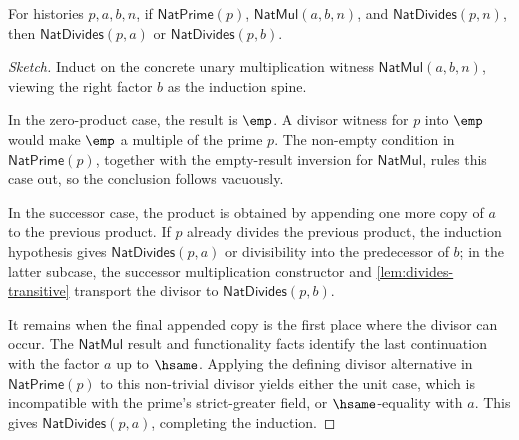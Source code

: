 \begin{theorem}
\label{thm:prime-divides-product-factor}
For histories $p,a,b,n$, if $\mathsf{NatPrime}(p)$, $\mathsf{NatMul}(a,b,n)$, and $\mathsf{NatDivides}(p,n)$, then $\mathsf{NatDivides}(p,a)$ or $\mathsf{NatDivides}(p,b)$.
\end{theorem}
\begin{proof}[Sketch]
Induct on the concrete unary multiplication witness $\mathsf{NatMul}(a,b,n)$, viewing the right factor $b$ as the induction spine.

In the zero-product case, the result is $\emp$. A divisor witness for $p$ into $\emp$ would make $\emp$ a multiple of the prime $p$. The non-empty condition in $\mathsf{NatPrime}(p)$, together with the empty-result inversion for $\mathsf{NatMul}$, rules this case out, so the conclusion follows vacuously.

In the successor case, the product is obtained by appending one more copy of $a$ to the previous product. If $p$ already divides the previous product, the induction hypothesis gives $\mathsf{NatDivides}(p,a)$ or divisibility into the predecessor of $b$; in the latter subcase, the successor multiplication constructor and \autoref{lem:divides-transitive} transport the divisor to $\mathsf{NatDivides}(p,b)$.

It remains when the final appended copy is the first place where the divisor can occur. The $\mathsf{NatMul}$ result and functionality facts identify the last continuation with the factor $a$ up to $\hsame$. Applying the defining divisor alternative in $\mathsf{NatPrime}(p)$ to this non-trivial divisor yields either the unit case, which is incompatible with the prime's strict-greater field, or $\hsame$-equality with $a$. This gives $\mathsf{NatDivides}(p,a)$, completing the induction.
\end{proof}
